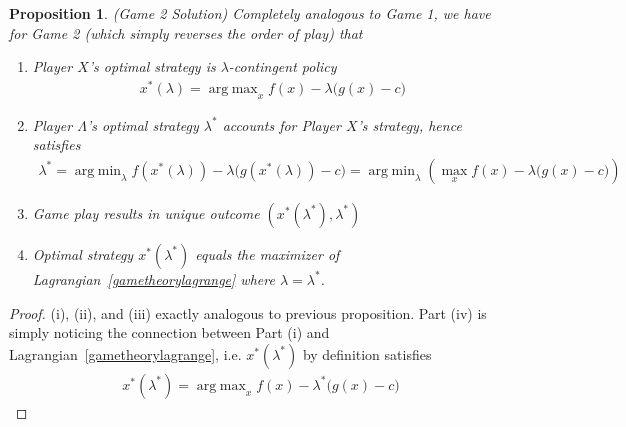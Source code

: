 \documentclass[12pt]{article}
\numberwithin{equation}{section} %
\theoremstyle{plain}
\newtheorem{prop}[thm]{Proposition}
\theoremstyle{definition}
\theoremstyle{remark}
\DeclareMathOperator*{\argmin}{arg\;min}
\DeclareMathOperator*{\argmax}{arg\;max}
\begin{document}
\begin{prop}
\emph{(Game 2 Solution)}
\label{prop:game2}
Completely analogous to Game 1, we have for Game 2 (which simply
reverses the order of play) that
\begin{enumerate}[label=\emph{(\roman*)}]
  \item Player $X$'s optimal strategy is $\lambda$-contingent policy
    \begin{align*}
      x^*(\lambda) = \argmax_x f(x)-\lambda\big(g(x)-c\big)
    \end{align*}
  \item
    Player $\Lambda$'s optimal strategy $\lambda^*$ accounts for Player
    $X$'s strategy, hence satisfies
    \begin{align*}
      \lambda^*
      = \argmin_\lambda f(x^*(\lambda))-\lambda \big(g(x^*(\lambda))-c\big)
      =
      \argmin_\lambda \left(
      \max_x f(x)-\lambda\big(g(x)-c\big)
      \right)
    \end{align*}
  \item Game play results in unique outcome
    $(x^*(\lambda^*),\lambda^*)$
  \item Optimal strategy $x^*(\lambda^*)$ equals the maximizer
    of Lagrangian~\ref{gametheorylagrange} where $\lambda=\lambda^*$.
\end{enumerate}
\end{prop}
\begin{proof}
(i), (ii), and (iii) exactly analogous to previous proposition.
Part (iv) is simply noticing the connection between Part (i) and
Lagrangian~\ref{gametheorylagrange}, i.e.
$x^*(\lambda^*)$ by definition satisfies
\begin{align*}
  x^*(\lambda^*)
  =
  \argmax_x f(x) - \lambda^*\big(g(x)-c\big)
\end{align*}
\end{proof}
\end{document}
